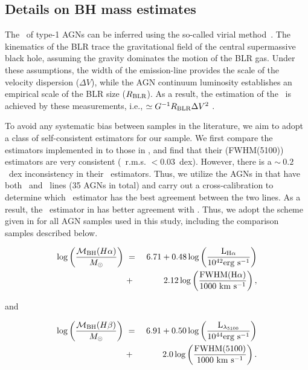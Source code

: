 \documentclass[apj]{emulateapj}
\begin{document}
\subsection{Details on BH mass estimates}
\label{mbh}

The \mbh\ of type-1 AGNs can be inferred using the so-called virial method~\citep{Peterson2004, Shen2013}. The kinematics of the BLR trace the gravitational field of the central supermassive black hole, assuming the gravity dominates the motion of the BLR gas. Under these assumptions, the width of the emission-line provides the scale of the velocity dispersion ($\Delta V$), while the AGN continuum luminosity establishes an empirical scale of the BLR size ($R_{\rm BLR}$). As a result, the estimation of the \mbh\ is achieved by these measurements, i.e., \mbh$\simeq G^{-1} R_{\rm BLR} \Delta V^2$ \citep{McLure2004}.

To avoid any systematic bias between samples in the literature, we aim to adopt a class of self-consistent estimators for our sample. We first compare the estimators implemented in \citet{Schulze2018} to those in \citet{Ding2017b}, and find that their \hbeta(FWHM(5100)) estimators are very consistent (\mbh\ r.m.s. $<0.03$~dex). However, there is a $\sim~0.2$~dex inconsistency in their \halpha\ estimators. Thus, we utilize the AGNs in \citet{Schulze2018} that have both \halpha\ and \hbeta\ lines (35 AGNs in total) and carry out a cross-calibration to determine which \halpha\ estimator has the best agreement between the two lines. As a  result, the \halpha\ estimator in \citet{Schulze2018} has better agreement with \hbeta. Thus, we adopt the scheme given in \citet{Schulze2018} for all AGN samples used in this study, including the comparison samples described below.

\begin{eqnarray}
\label{eq:Ha}
\log \left(\frac{\mathcal M_{\rm BH} (H\alpha)}{M_{\odot}}\right)&~=~& 6.71+0.48 \log \left(\frac{ \rm L _{H\alpha}}{10^{42}{\rm erg~s^{-1}}}\right) \nonumber\\
&~+~& 2.12 \log \left(\frac{\rm FWHM(H\alpha)}{1000 ~{\rm km~s^{-1}}}\right) ,
\end {eqnarray}

and

\begin{eqnarray}
\label{eq:Hb}
\log \left(\frac{\mathcal M_{\rm BH}(H\beta) }{M_{\odot}}\right)&~=~& 6.91+0.50\log \left(\frac{ \rm L _{\lambda_{5100}}}{10^{44}{\rm erg~s^{-1}}}\right) \nonumber\\
&~+~& 2.0 \log \left(\frac{\rm FWHM(5100)}{1000 ~{\rm km~s^{-1}}}\right) .
\end {eqnarray}
\end{document}
